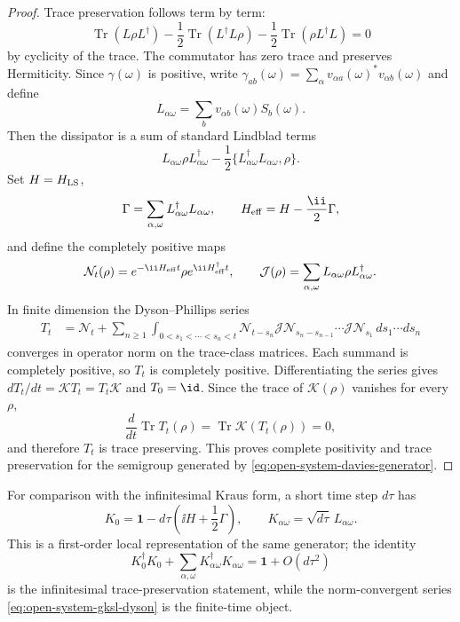 \begin{proof}
Trace preservation follows term by term:
\[
  \operatorname{Tr}(L\rho L^\dagger)
  -\frac12\operatorname{Tr}(L^\dagger L\rho)
  -\frac12\operatorname{Tr}(\rho L^\dagger L)=0
\]
by cyclicity of the trace.  The commutator has zero trace and preserves
Hermiticity.  Since \(\gamma(\omega)\) is positive, write
\(\gamma_{ab}(\omega)=\sum_\alpha v_{\alpha a}(\omega)^*
v_{\alpha b}(\omega)\) and define
\[
  L_{\alpha\omega}=\sum_b v_{\alpha b}(\omega)S_b(\omega).
\]
Then the dissipator is a sum of standard Lindblad terms
\[
  L_{\alpha\omega}\rho L_{\alpha\omega}^\dagger
  -\frac12\{L_{\alpha\omega}^\dagger L_{\alpha\omega},\rho\}.
\]
Set \(H=H_{\rm LS}\),
\[
  \Gamma=\sum_{\alpha,\omega}
  L_{\alpha\omega}^\dagger L_{\alpha\omega},
  \qquad
  H_{\rm eff}=H-\frac{\ii}{2}\Gamma ,
\]
and define the completely positive maps
\[
  \mathcal N_t(\rho)=
  e^{-\ii H_{\rm eff}t}\rho e^{\ii H_{\rm eff}^\dagger t},
  \qquad
  \mathcal J(\rho)=
  \sum_{\alpha,\omega}
  L_{\alpha\omega}\rho L_{\alpha\omega}^\dagger .
\]
In finite dimension the Dyson--Phillips series
\begin{align}
  T_t
  &=
  \mathcal N_t
  +
  \sum_{n\ge1}
  \int_{0<s_1<\cdots<s_n<t}
  \mathcal N_{t-s_n}\mathcal J
  \mathcal N_{s_n-s_{n-1}}\cdots
  \mathcal J\mathcal N_{s_1}\,
  ds_1\cdots ds_n
  \label{eq:open-system-gksl-dyson}
\end{align}
converges in operator norm on the trace-class matrices.  Each summand is
completely positive, so \(T_t\) is completely positive.  Differentiating the
series gives \(dT_t/dt=\mathcal K T_t=T_t\mathcal K\) and \(T_0=\id\).
Since the trace of \(\mathcal K(\rho)\) vanishes for every \(\rho\),
\[
  \frac{d}{dt}\operatorname{Tr}T_t(\rho)
  =
  \operatorname{Tr}\mathcal K(T_t(\rho))=0,
\]
and therefore \(T_t\) is trace preserving.  This proves complete positivity
and trace preservation for the semigroup generated by
\eqref{eq:open-system-davies-generator}.
\end{proof}

For comparison with the infinitesimal Kraus form, a short time step
\(d\tau\) has
\[
  K_0=\mathbf 1-d\tau\left(\ii H
  +\frac12\Gamma\right),
  \qquad
  K_{\alpha\omega}=\sqrt{d\tau}\,L_{\alpha\omega}.
\]
This is a first-order local representation of the same generator; the
identity
\[
  K_0^\dagger K_0
  +
  \sum_{\alpha,\omega}
  K_{\alpha\omega}^\dagger K_{\alpha\omega}
  =
  \mathbf 1+O(d\tau^2)
\]
is the infinitesimal trace-preservation statement, while the norm-convergent
series \eqref{eq:open-system-gksl-dyson} is the finite-time object.

